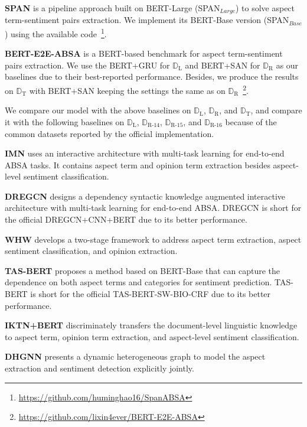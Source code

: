 \documentclass[11pt,a4paper]{article}
\begin{document}
\noindent
\textbf{SPAN} \cite{Hu2019} is a pipeline approach built on BERT-Large (SPAN$_{Large}$) to solve aspect term-sentiment pairs extraction. We implement its BERT-Base version (SPAN$_{Base}$) using the available code~\footnote{\url{https://github.com/huminghao16/SpanABSA}}.

\noindent
\textbf{BERT-E2E-ABSA} \cite{Li2019b} is a BERT-based benchmark for aspect term-sentiment pairs extraction. We use the BERT+GRU for $\mathbb{D}_\text{L}$ and BERT+SAN for $\mathbb{D}_\text{R}$ as our baselines due to their best-reported performance. Besides, we produce the results on $\mathbb{D}_\text{T}$ with BERT+SAN keeping the settings the same as on $\mathbb{D}_\text{R}$~\footnote{\url{https://github.com/lixin4ever/BERT-E2E-ABSA}}.

We compare our model with the above baselines on $\mathbb{D}_\text{L}$, $\mathbb{D}_\text{R}$, and $\mathbb{D}_\text{T}$, and compare it with the following baselines on $\mathbb{D}_\text{L}$, $\mathbb{D}_\text{R-14}$, $\mathbb{D}_\text{R-15}$, and $\mathbb{D}_\text{R-16}$ because of the common datasets reported by the official implementation.

\noindent
\textbf{IMN} \cite{He2019} uses an interactive architecture with multi-task learning for end-to-end ABSA tasks. It contains aspect term and opinion term extraction besides aspect-level sentiment classification.

\noindent
\textbf{DREGCN} \cite{Liang2020a} designs a dependency syntactic knowledge augmented interactive architecture with multi-task learning for end-to-end ABSA. DREGCN is short for the official DREGCN+CNN+BERT due to its better performance.

\noindent
\textbf{WHW} \cite{Peng2020} develops a two-stage framework to address aspect term extraction, aspect sentiment classification,
and opinion extraction.

\noindent
\textbf{TAS-BERT} \cite{Wan2020} proposes a method based on BERT-Base that can capture the dependence on both aspect terms and categories for sentiment prediction. TAS-BERT is short for the official TAS-BERT-SW-BIO-CRF due to its better performance.

\noindent
\textbf{IKTN+BERT} \cite{Liang2020} discriminately transfers the document-level linguistic knowledge to aspect term, opinion term extraction, and aspect-level sentiment classification.

\noindent
\textbf{DHGNN} \cite{Liu2020} presents a dynamic heterogeneous graph to model the aspect extraction and sentiment detection explicitly jointly.
\end{document}
